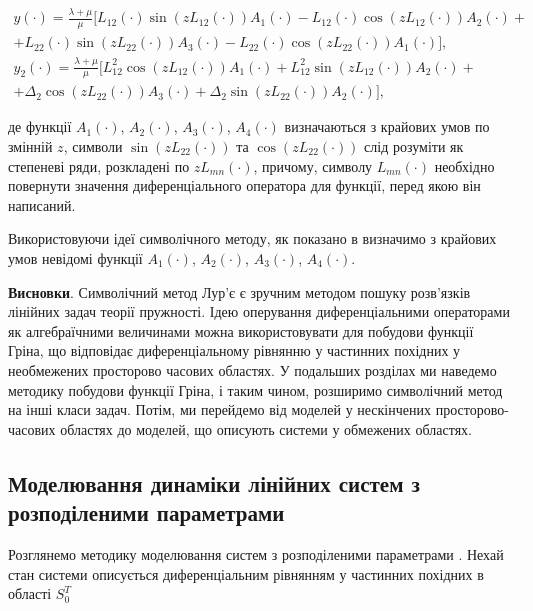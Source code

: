 \begin{gather*}
y(\cdot) = \frac{\lambda + \mu}{\mu}[L_{12}(\cdot)\sin(zL_{12}(\cdot))A_1(\cdot) -
L_{12}(\cdot)\cos(zL_{12}(\cdot))A_2(\cdot) + \\
+L_{22}(\cdot)\sin(zL_{22}(\cdot))A_3(\cdot) -
L_{22}(\cdot)\cos(zL_{22}(\cdot))A_1(\cdot)], \\
y_2(\cdot) = \frac{\lambda + \mu}{\mu}[L_{12}^2\cos(zL_{12}(\cdot))A_1(\cdot) +
L_{12}^2\sin(zL_{12}(\cdot))A_2(\cdot) + \\
+\Delta_2\cos(zL_{22}(\cdot))A_3(\cdot) +
\Delta_2\sin(zL_{22}(\cdot))A_2(\cdot)],
\end{gather*}

де функції $A_1(\cdot)$, $A_2(\cdot)$, $A_3(\cdot)$, $A_4(\cdot)$ визначаються з крайових умов по
змінній $z$, символи $\sin(zL_{22}(\cdot))$ та $\cos(zL_{22}(\cdot))$ слід розуміти як степеневі ряди,
розкладені по $zL_{mn}(\cdot)$, причому, символу $L_{mn}(\cdot)$ необхідно повернути значення диференціального оператора для функції,
перед якою він написаний.

Використовуючи ідеї символічного методу, як показано в \cite{Skopetskiy-Matematychne} визначимо з
крайових умов невідомі функції $A_1(\cdot)$, $A_2(\cdot)$, $A_3(\cdot)$, $A_4(\cdot)$.


\textbf{Висновки}. Символічний метод Лур’є є зручним методом пошуку розв’язків лінійних задач теорії пружності. Ідею
оперування диференціальними операторами як алгебраїчними величинами можна використовувати для побудови функції Гріна,
що відповідає диференціальному рівнянню у частинних похідних у необмежених просторово часових областях. У подальших
розділах ми наведемо методику побудови функції Гріна, і таким чином,  розширимо символічний метод на інші класи задач.
Потім, ми перейдемо від моделей у нескінчених просторово-часових областях до моделей, що описують системи у
обмежених областях.

\subsection{Моделювання динаміки лінійних систем з розподіленими параметрами} \label{sect1_3_2}

Розглянемо методику моделювання систем з розподіленими параметрами
\cite{Blagoveshenskaya-Matematychne, Bogaenko-Avtomatyzatsiya, Skopetskiy-Matematychne,
Stoyan-DoPobudovy, Stoyan-Modeliuvannia}. Нехай стан системи
описується диференціальним рівнянням у частинних похідних в області $S_0^T$

